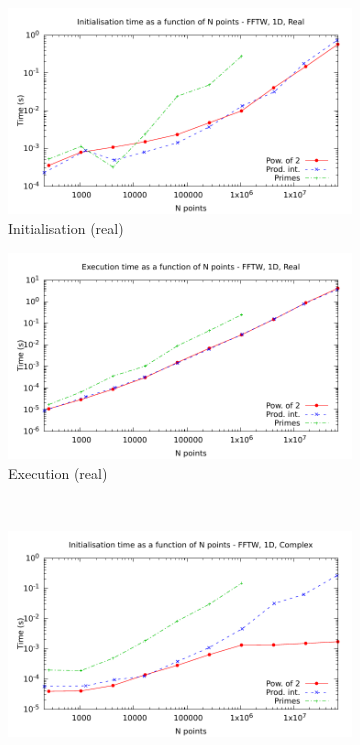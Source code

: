 \documentclass[12pt, a4paper]{article} \setlength{\textheight}{24cm}
\begin{document}
 
\begin{figure}[htb]
  \centering
  \begin{subfigure}{.5\textwidth}
    \centering
    \includegraphics[width=.9\linewidth]{graphs/1d-fftw-init-r.pdf}
    \caption{Initialisation (real)}
    \label{1DFFTWRI}
  \end{subfigure}%
  \begin{subfigure}{.5\textwidth}
    \centering
    \includegraphics[width=.9\linewidth]{graphs/1d-fftw-exec-r.pdf}
    \caption{Execution (real)}
    \label{1DFFTWR}
  \end{subfigure}\\
  \begin{subfigure}{.5\textwidth}
    \centering
    \includegraphics[width=.9\linewidth]{graphs/1d-fftw-init-c.pdf}

\end{subfigure}
\end{figure}
\end{document}
